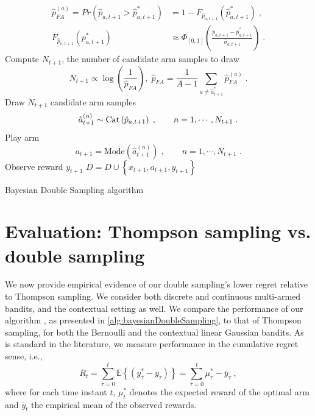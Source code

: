 \documentclass{article}
\newcommand{\eValue}[1]{\mathbb{E}\left\{ #1 \right\}}
\newcommand{\ie}{i.e., }
\newcommand{\Cat}{{\rm Cat}}
\begin{document}
\begin{algorithm}
\begin{algorithmic}
		\begin{equation}
		\begin{split}
		\hat{p}_{FA}^{(a)} =Pr\left(\hat{p}_{a,t+1} > \hat{p}^*_{a,t+1} \right) &= 1 - F_{\hat{p}_{a,t+1}}(\hat{p}^*_{a,{t+1}}) \; , \\
		F_{\hat{p}_{a,t+1}}(p^*_{a,{t+1}}) &\approx \Phi_{[0,1]}\left(\frac{\hat{p}_{a,t+1} - \hat{p}^*_{a,{t+1}}}{\hat{\sigma}_{a,t+1}}\right) \;.
		\end{split}
		\end{equation}
		\EndFor
		\State Compute $N_{t+1}$, the number of candidate arm samples to draw
		\begin{equation}
		N_{t+1} \propto \log\left(\frac{1}{\hat{p}_{FA}}\right), \; \hat{p}_{FA}=\frac{1}{A-1}\sum_{a \neq \hat{a}_{t+1}^*}\hat{p}_{FA}^{(a)}\; .
		\end{equation}
		\State Draw $N_{t+1}$ candidate arm samples
		\begin{equation}
		\hat{a}_{t+1}^{(n)} \sim \Cat \left(\hat{p}_{a,t+1}\right) \; , \qquad n=1,\cdots, N_{t+1} \; .
		\end{equation}
		\State Play arm
		\begin{equation}
		a_{t+1} = \text{Mode}\left(\hat{a}_{t+1}^{(n)}\right) \; , \qquad  n=1,\cdots,N_{t+1} \;.
		\end{equation}
		\State Observe reward $y_{t+1}$
		\State $D=D \cup \left\{x_{t+1}, a_{t+1}, y_{t+1}\right\}$
		\EndFor
	\end{algorithmic}
	\caption{Bayesian Double Sampling algorithm}
	\label{alg:bayesianDoubleSampling}
\end{algorithm}

\section{Evaluation: Thompson sampling vs. double sampling}
\label{sec:evaluation}

We now provide empirical evidence of our double sampling's lower regret relative to Thompson sampling. We consider both discrete and continuous multi-armed bandits, and the contextual setting as well. We compare the performance of our algorithm , as presented in \autoref{alg:bayesianDoubleSampling}, to that of Thompson sampling, for both the Bernoulli and the contextual linear Gaussian bandits. As is standard in the literature, we measure performance in the cumulative regret sense, \ie
\begin{equation}
R_t=\sum_{\tau=0}^t \eValue{\left(y^*_{\tau}-y_{\tau} \right)} = \sum_{\tau=0}^t \mu_\tau^*-\bar{y}_{\tau} \; ,
\end{equation}
where for each time instant $t$, $\mu_t^*$ denotes the expected reward of the optimal arm and $\bar{y}_{t}$ the empirical mean of the observed rewards.
\end{document}
